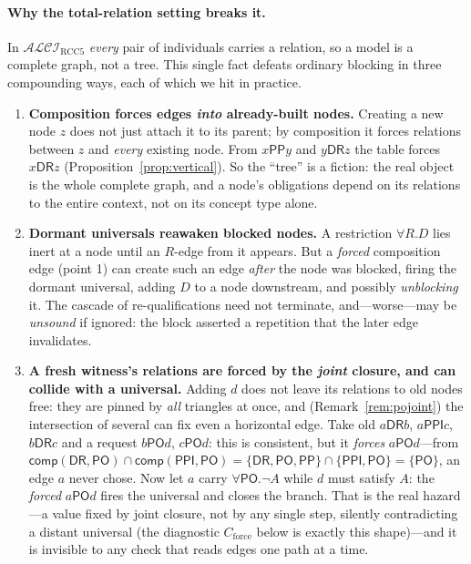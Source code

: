 \documentclass[11pt]{article}
\newcommand{\ALCIRCC}[1]{\mathcal{ALCI}_{\mathrm{RCC#1}}}
\newcommand{\DR}{\mathsf{DR}}
\newcommand{\PO}{\mathsf{PO}}
\newcommand{\PP}{\mathsf{PP}}
\newcommand{\PPI}{\mathsf{PPI}}
\newcommand{\comp}{\ensuremath{\mathsf{comp}}}
\theoremstyle{plain}
\theoremstyle{definition}
\begin{document}
\paragraph{Why the total-relation setting breaks it.} In $\ALCIRCC{5}$
\emph{every} pair of individuals carries a relation, so a model is a
complete graph, not a tree. This single fact defeats ordinary blocking in
three compounding ways, each of which we hit in practice.
\begin{enumerate}
  \item \textbf{Composition forces edges \emph{into} already-built
    nodes.} Creating a new node $z$ does not just attach it to its
    parent; by composition it forces relations between $z$ and
    \emph{every} existing node. From $x\mathbin{\PP}y$ and
    $y\mathbin{\DR}z$ the table forces $x\mathbin{\DR}z$
    (Proposition~\ref{prop:vertical}). So the ``tree'' is a fiction: the
    real object is the whole complete graph, and a node's obligations
    depend on its relations to the entire context, not on its concept
    type alone.
  \item \textbf{Dormant universals reawaken blocked nodes.} A restriction
    $\forall R.D$ lies inert at a node until an $R$-edge from it appears.
    But a \emph{forced} composition edge (point 1) can create such an edge
    \emph{after} the node was blocked, firing the dormant universal,
    adding $D$ to a node downstream, and possibly \emph{unblocking} it.
    The cascade of re-qualifications need not terminate, and---worse---may
    be \emph{unsound} if ignored: the block asserted a repetition that the
    later edge invalidates.
  \item \textbf{A fresh witness's relations are forced by the \emph{joint}
    closure, and can collide with a universal.} Adding $d$ does not leave its
    relations to old nodes free: they are pinned by \emph{all} triangles at
    once, and (Remark~\ref{rem:pojoint}) the intersection of several can fix
    even a horizontal edge. Take old $a\mathbin{\DR}b$, $a\mathbin{\PPI}c$,
    $b\mathbin{\DR}c$ and a request $b\mathbin{\PO}d$, $c\mathbin{\PO}d$: this
    is consistent, but it \emph{forces} $a\mathbin{\PO}d$---from
    $\comp(\DR,\PO)\cap\comp(\PPI,\PO)=\{\DR,\PO,\PP\}\cap\{\PPI,\PO\}=\{\PO\}$,
    an edge $a$ never chose. Now let $a$ carry $\forall\PO.\neg A$ while $d$
    must satisfy $A$: the \emph{forced} $a\mathbin{\PO}d$ fires the universal
    and closes the branch. That is the real hazard---a value fixed by joint
    closure, not by any single step, silently contradicting a distant
    universal (the diagnostic $C_{\mathrm{force}}$ below is exactly this
    shape)---and it is invisible to any check that reads edges one path at a
    time.
\end{enumerate}
\end{document}

